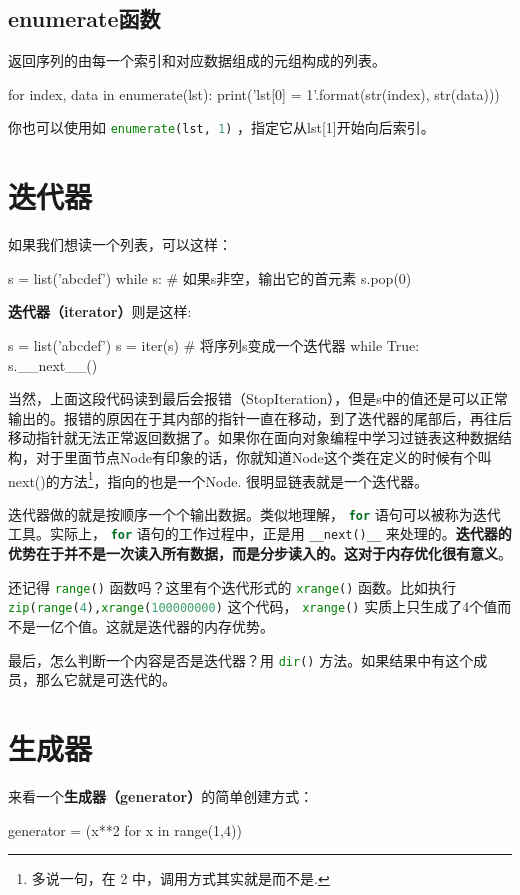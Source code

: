 \documentclass[a4paper,12pt]{report}
\newcommand{\pyline}[1]{{ \lstinline[language=Python, basicstyle=\ttfamily]{#1} }}
\newcommand{\python}{{\ttfamily{Python}}}
\newcommand{\qd}[1]{{\bfseries{#1}}}	%
\newcommand{\mytt}[1]{{\ttfamily{#1}}}
\newcommand{\co}[1]{{\bfseries{#1}}}   %
\begin{document}
\subsection{enumerate函数}
\label{sec:enumerate}
返回序列的由每一个索引和对应数据组成的元组构成的列表。
\begin{py}
for index, data in enumerate(lst):
    print('lst[{0}] = {1}'.format(str(index), str(data)))
\end{py}

你也可以使用如\pyline{enumerate(lst, 1)}，指定它从lst[1]开始向后索引。

\section{迭代器}
如果我们想读一个列表，可以这样：
\begin{py}
s = list('abcdef')
while s: # 如果s非空，输出它的首元素
    s.pop(0)
\end{py}

\co{迭代器（iterator）}则是这样:
\begin{py}
s = list('abcdef')
s = iter(s) # 将序列s变成一个迭代器
while True:
    s.__next__()
\end{py}

当然，上面这段代码读到最后会报错（StopIteration），但是s中的值还是可以正常输出的。报错的原因在于其内部的指针一直在移动，到了迭代器的尾部后，再往后移动指针就无法正常返回数据了。如果你在面向对象编程中学习过链表这种数据结构，对于里面节点Node有印象的话，你就知道Node这个类在定义的时候有个叫next()的方法\footnote{多说一句，在\python{} 2 中，调用方式其实就是\mytt{next()}而不是\mytt{\_\_next()\_\_}.}，指向的也是一个Node. 很明显链表就是一个迭代器。

迭代器做的就是按顺序一个个输出数据。类似地理解，\pyline{for}语句可以被称为迭代工具。实际上，\pyline{for}语句的工作过程中，正是用\pyline{__next()__}来处理的。\qd{迭代器的优势在于并不是一次读入所有数据，而是分步读入的。这对于内存优化很有意义}。

还记得\pyline{range()}函数吗？这里有个迭代形式的\pyline{xrange()}函数。比如执行\pyline{zip(range(4),xrange(100000000)}这个代码，\pyline{xrange()}实质上只生成了4个值而不是一亿个值。这就是迭代器的内存优势。

最后，怎么判断一个内容是否是迭代器？用\pyline{dir()}方法。如果结果中有\mytt{\_\_iter\_\_}这个成员，那么它就是可迭代的。

\section{生成器}
\label{sec:generator}
来看一个\co{生成器（generator）}的简单创建方式：
\begin{py}
generator = (x**2 for x in range(1,4))
\end{py}
\end{document}

